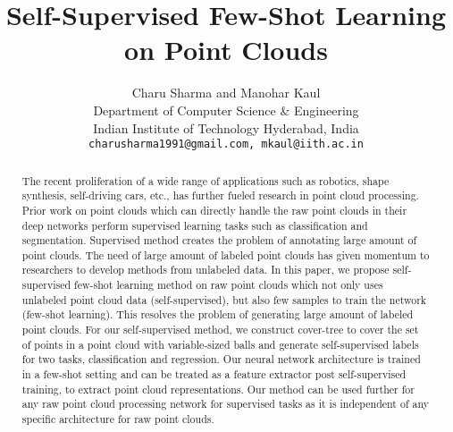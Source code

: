 \documentclass{article}
\title{Self-Supervised Few-Shot Learning on Point Clouds}
\author{Charu Sharma and Manohar Kaul \\
  Department of Computer Science \& Engineering\\
  Indian Institute of Technology Hyderabad, India\\
\texttt{charusharma1991@gmail.com, mkaul@iith.ac.in} \\
}
\begin{document}
\maketitle

\begin{abstract}
The recent proliferation of a wide range of applications such as robotics, shape synthesis, self-driving cars, etc., has further fueled research in point cloud processing. Prior work on point clouds which can directly handle the raw point clouds in their deep networks perform supervised learning tasks such as classification and segmentation. Supervised method creates the problem of annotating large amount of point clouds. The need of large amount of labeled point clouds has given momentum to researchers to develop methods from unlabeled data. In this paper, we propose self-supervised few-shot learning method on raw point clouds which not only uses unlabeled point cloud data (self-supervised), but also few samples to train the network (few-shot learning). This resolves the problem of generating large amount of labeled point clouds. For our self-supervised method, we construct cover-tree to cover the set of points in a point cloud with variable-sized balls and generate self-supervised labels for two tasks, classification and regression. Our neural network architecture is trained in a few-shot setting and can be treated as a feature extractor post self-supervised training, to extract point cloud representations. Our method can be used further for any raw point cloud processing network for supervised tasks as it is independent of any specific architecture for raw point clouds. 


\end{abstract}
\end{document}
